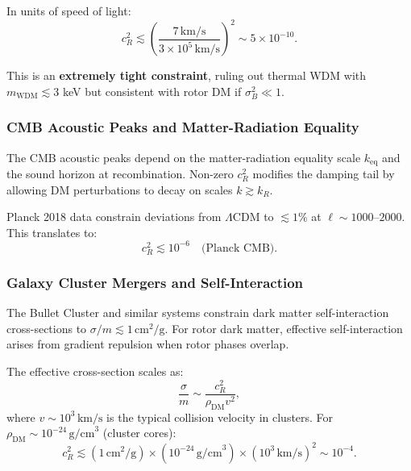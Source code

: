 \documentclass[11pt,a4paper]{article}
\numberwithin{equation}{section}
\theoremstyle{plain}
\theoremstyle{definition}
\theoremstyle{remark}
\begin{document}
In units of speed of light:
\begin{equation}
c_R^2 \lesssim \left(\frac{7\,\text{km/s}}{3\times 10^5\,\text{km/s}}\right)^2 \sim 5 \times 10^{-10}.
\label{eq:lya-constraint}
\end{equation}

This is an \textbf{extremely tight constraint}, ruling out thermal WDM with $m_{\text{WDM}} \lesssim 3$ keV but consistent with rotor DM if $\sigma_B^2 \ll 1$.

\subsubsection{CMB Acoustic Peaks and Matter-Radiation Equality}

The CMB acoustic peaks depend on the matter-radiation equality scale $k_{\text{eq}}$ and the sound horizon at recombination. Non-zero $c_R^2$ modifies the damping tail by allowing DM perturbations to decay on scales $k \gtrsim k_R$.

Planck 2018 data constrain deviations from $\Lambda$CDM to $\lesssim 1\%$ at $\ell \sim 1000$--$2000$. This translates to:
\begin{equation}
c_R^2 \lesssim 10^{-6} \quad\text{(Planck CMB)}.
\label{eq:cmb-constraint}
\end{equation}

\subsubsection{Galaxy Cluster Mergers and Self-Interaction}

The Bullet Cluster and similar systems constrain dark matter self-interaction cross-sections to $\sigma/m \lesssim 1\,\text{cm}^2/\text{g}$. For rotor dark matter, effective self-interaction arises from gradient repulsion when rotor phases overlap.

The effective cross-section scales as:
\begin{equation}
\frac{\sigma}{m} \sim \frac{c_R^2}{\rho_{\text{DM}} v^2},
\end{equation}
where $v \sim 10^3\,\text{km/s}$ is the typical collision velocity in clusters. For $\rho_{\text{DM}} \sim 10^{-24}\,\text{g/cm}^3$ (cluster cores):
\begin{equation}
c_R^2 \lesssim (1\,\text{cm}^2/\text{g}) \times (10^{-24}\,\text{g/cm}^3) \times (10^3\,\text{km/s})^2 \sim 10^{-4}.
\label{eq:cluster-constraint}
\end{equation}
\end{document}
